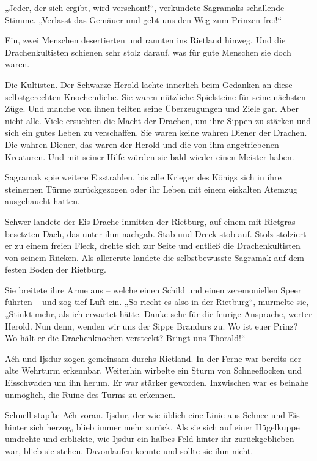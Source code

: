 „Jeder, der sich ergibt, wird verschont!“, verkündete Sagramaks schallende Stimme. „Verlasst das Gemäuer und gebt uns den Weg zum Prinzen frei!“

Ein, zwei Menschen desertierten und rannten ins Rietland hinweg. Und die Drachenkultisten schienen sehr stolz darauf, was für gute Menschen sie doch waren.

Die Kultisten. Der Schwarze Herold lachte innerlich beim Gedanken an diese selbstgerechten Knochendiebe. Sie waren nützliche Spielsteine für seine nächsten Züge. Und manche von ihnen teilten seine Überzeugungen und Ziele gar. Aber nicht alle. Viele ersuchten die Macht der Drachen, um ihre Sippen zu stärken und sich ein gutes Leben zu verschaffen. Sie waren keine wahren Diener der Drachen. Die wahren Diener, das waren der Herold und die von ihm angetriebenen Kreaturen. Und mit seiner Hilfe würden sie bald wieder einen Meister haben.

Sagramak spie weitere Eisstrahlen, bis alle Krieger des Königs sich in ihre steinernen Türme zurückgezogen oder ihr Leben mit einem eiskalten Atemzug ausgehaucht hatten.

Schwer landete der Eis-Drache inmitten der Rietburg, auf einem mit Rietgras besetzten Dach, das unter ihm nachgab. Stab und Dreck stob auf. Stolz stolziert er zu einem freien Fleck, drehte sich zur Seite und entließ die Drachenkultisten von seinem Rücken. Als allererste landete die selbstbewusste Sagramak auf dem festen Boden der Rietburg.

Sie breitete ihre Arme aus – welche einen Schild und einen zeremoniellen Speer führten – und zog tief Luft ein. „So riecht es also in der Rietburg“, murmelte sie, „Stinkt mehr, als ich erwartet hätte. Danke sehr für die feurige Ansprache, werter Herold. Nun denn, wenden wir uns der Sippe Brandurs zu. Wo ist euer Prinz? Wo hält er die Drachenknochen versteckt? Bringt uns Thorald!“\bigskip







Aćh und Ijsdur zogen gemeinsam durchs Rietland. In der Ferne war bereits der alte Wehrturm erkennbar. Weiterhin wirbelte ein Sturm von Schneeflocken und Eisschwaden um ihn herum. Er war stärker geworden. Inzwischen war es beinahe unmöglich, die Ruine des Turms zu erkennen.

Schnell stapfte Aćh voran. Ijsdur, der wie üblich eine Linie aus Schnee und Eis hinter sich herzog, blieb immer mehr zurück. Als sie sich auf einer Hügelkuppe umdrehte und erblickte, wie Ijsdur ein halbes Feld hinter ihr zurückgeblieben war, blieb sie stehen. Davonlaufen konnte und sollte sie ihm nicht.

